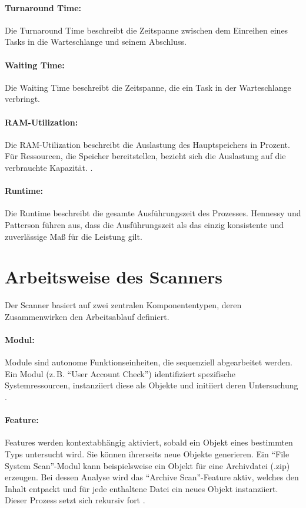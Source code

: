 \begin{sloppypar}
\paragraph{Turnaround Time:}
Die Turnaround Time beschreibt die Zeitspanne zwischen dem Einreihen eines Tasks in die Warteschlange und seinem Abschluss.

\paragraph{Waiting Time:}
Die Waiting Time beschreibt die Zeitspanne, die ein Task in der Warteschlange verbringt.

\paragraph{RAM-Utilization:}
Die RAM-Utilization beschreibt die Auslastung des Hauptspeichers in Prozent.
Für Ressourcen, die Speicher bereitstellen, bezieht sich die Auslastung auf die verbrauchte Kapazität.
 \cite[S.~22]{Gregg:2020}.

\paragraph{Runtime:}
Die Runtime beschreibt die gesamte Ausführungszeit des Prozesses.
Hennessy und Patterson \cite[S.~39--40]{Hennessy:2019} führen aus,
dass die Ausführungszeit als das einzig konsistente und zuverlässige Maß für die Leistung gilt.


\vspace{7.56mm}

\section{Arbeitsweise des Scanners}
Der Scanner basiert auf zwei zentralen Komponententypen, deren Zusammenwirken den Arbeitsablauf definiert. 

\paragraph{Modul:}
Module sind autonome Funktionseinheiten, die sequenziell abgearbeitet werden.
Ein Modul (z.\,B. \enquote{User Account Check}) identifiziert spezifische Systemressourcen,
instanziiert diese als Objekte und initiiert deren Untersuchung \cite{thor:modules}.

\paragraph{Feature:}
Features werden kontextabhängig aktiviert, sobald ein Objekt eines bestimmten Typs untersucht wird.
Sie können ihrerseits neue Objekte generieren.
Ein \enquote{File System Scan}-Modul kann beispielsweise ein Objekt für eine Archivdatei (.zip) erzeugen.
Bei dessen Analyse wird das \enquote{Archive Scan}-Feature aktiv,
welches den Inhalt entpackt und für jede enthaltene Datei ein neues Objekt instanziiert.
Dieser Prozess setzt sich rekursiv fort \cite{thor:features}.


\end{sloppypar}
